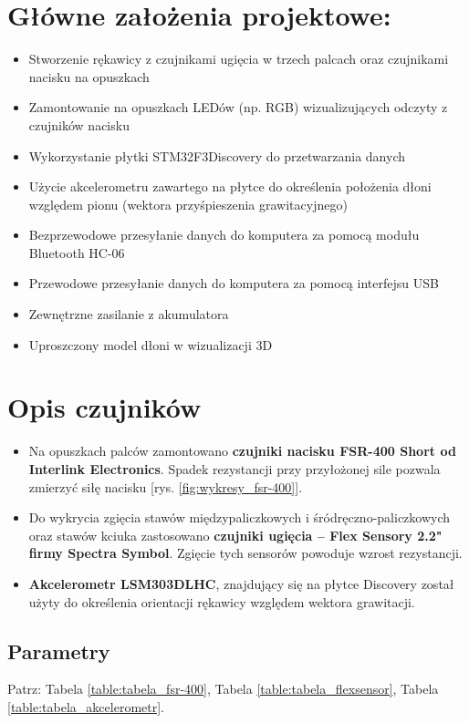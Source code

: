 \documentclass[12pt,a4paper]{article}
\begin{document}
\maketitle
\tableofcontents
\newpage


\section{Główne założenia projektowe: }\normalsize
\begin{itemize}
\item Stworzenie rękawicy z czujnikami ugięcia w trzech palcach oraz czujnikami nacisku na opuszkach
\item Zamontowanie na opuszkach LEDów (np. RGB) wizualizujących odczyty z czujników nacisku
\item Wykorzystanie płytki STM32F3Discovery do przetwarzania danych
\item Użycie akcelerometru zawartego na płytce do określenia położenia dłoni względem pionu (wektora przyśpieszenia grawitacyjnego)
\item Bezprzewodowe przesyłanie danych do komputera za pomocą modułu Bluetooth HC-06
\item Przewodowe przesyłanie danych do komputera za pomocą interfejsu USB
\item Zewnętrzne zasilanie z akumulatora
\item Uproszczony model dłoni w wizualizacji 3D
\end{itemize}

\section{Opis czujników}
\begin{itemize}
\item Na opuszkach palców zamontowano \textbf{czujniki nacisku FSR-400 Short od Interlink Electronics}. Spadek rezystancji przy przyłożonej sile pozwala zmierzyć siłę nacisku [rys. \ref{fig:wykresy_fsr-400}].
\item Do wykrycia zgięcia stawów międzypaliczkowych i śródręczno-paliczkowych oraz stawów kciuka zastosowano \textbf{czujniki ugięcia -- Flex Sensory 2.2" firmy Spectra Symbol}. Zgięcie tych sensorów powoduje wzrost rezystancji.
\item \textbf{Akcelerometr LSM303DLHC}, znajdujący się na płytce Discovery został użyty do określenia orientacji rękawicy względem wektora grawitacji.
\end{itemize}
\subsection{Parametry}
Patrz: Tabela \ref{table:tabela_fsr-400}, Tabela \ref{table:tabela_flexsensor}, Tabela \ref{table:tabela_akcelerometr}.
\end{document}
